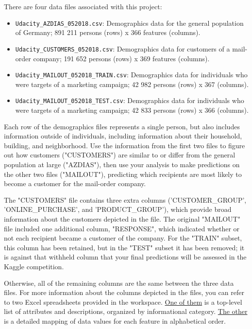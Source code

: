 \documentclass[11pt]{article}
\providecommand{\tightlist}{%
      \setlength{\itemsep}{0pt}\setlength{\parskip}{0pt}}
\begin{document}
There are four data files associated with this project:

\begin{itemize}
\tightlist
\item
  \texttt{Udacity\_AZDIAS\_052018.csv}: Demographics data for the
  general population of Germany; 891 211 persons (rows) x 366 features
  (columns).
\item
  \texttt{Udacity\_CUSTOMERS\_052018.csv}: Demographics data for
  customers of a mail-order company; 191 652 persons (rows) x 369
  features (columns).
\item
  \texttt{Udacity\_MAILOUT\_052018\_TRAIN.csv}: Demographics data for
  individuals who were targets of a marketing campaign; 42 982 persons
  (rows) x 367 (columns).
\item
  \texttt{Udacity\_MAILOUT\_052018\_TEST.csv}: Demographics data for
  individuals who were targets of a marketing campaign; 42 833 persons
  (rows) x 366 (columns).
\end{itemize}

Each row of the demographics files represents a single person, but also
includes information outside of individuals, including information about
their household, building, and neighborhood. Use the information from
the first two files to figure out how customers ("CUSTOMERS") are
similar to or differ from the general population at large ("AZDIAS"),
then use your analysis to make predictions on the other two files
("MAILOUT"), predicting which recipients are most likely to become a
customer for the mail-order company.

The "CUSTOMERS" file contains three extra columns ('CUSTOMER\_GROUP',
'ONLINE\_PURCHASE', and 'PRODUCT\_GROUP'), which provide broad
information about the customers depicted in the file. The original
"MAILOUT" file included one additional column, "RESPONSE", which
indicated whether or not each recipient became a customer of the
company. For the "TRAIN" subset, this column has been retained, but in
the "TEST" subset it has been removed; it is against that withheld
column that your final predictions will be assessed in the Kaggle
competition.

Otherwise, all of the remaining columns are the same between the three
data files. For more information about the columns depicted in the
files, you can refer to two Excel spreadsheets provided in the
workspace.
\href{./DIAS\%20Information\%20Levels\%20-\%20Attributes\%202017.xlsx}{One
of them} is a top-level list of attributes and descriptions, organized
by informational category.
\href{./DIAS\%20Attributes\%20-\%20Values\%202017.xlsx}{The other} is a
detailed mapping of data values for each feature in alphabetical order.
\end{document}
